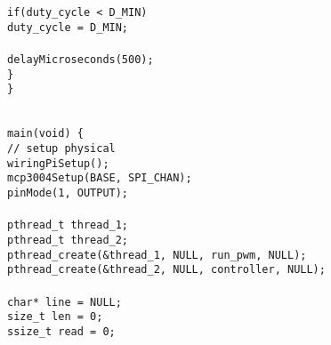 \documentclass[a4paper, 12pt]{article}
\begin{document}
\begin{appendices}
	\texttt{\hspace*{2em}if(duty\_cycle < D\_MIN)} \\\noindent
	\texttt{\hspace*{3em}duty\_cycle = D\_MIN;} \\\noindent
	\texttt{ \\\noindent}
	\texttt{\hspace*{2em}delayMicroseconds(500);} \\\noindent
	\texttt{\hspace*{1em}\}}\\\noindent
        \texttt{\}} \\\noindent
        \texttt{ \\\noindent}

	\texttt{main(void) \{ \\\noindent}
	\texttt{\hspace*{1em}// setup physical} \\\noindent
	\texttt{\hspace*{1em}wiringPiSetup();} \\\noindent
	\texttt{\hspace*{1em}mcp3004Setup(BASE, SPI\_CHAN);} \\\noindent
	\texttt{\hspace*{1em}pinMode(1, OUTPUT); } \\\noindent
	\texttt{\hspace*{1em}\\\noindent}
	\texttt{\hspace*{1em}pthread\_t thread\_1;} \\\noindent
	\texttt{\hspace*{1em}pthread\_t thread\_2;} \\\noindent
	\texttt{\hspace*{1em}pthread\_create(\&thread\_1, NULL, run\_pwm, NULL);} \\\noindent
	\texttt{\hspace*{1em}pthread\_create(\&thread\_2, NULL, controller, NULL);} \\\noindent
	\texttt{\hspace*{1em}\\\noindent}
	\texttt{\hspace*{1em}char* line = NULL;} \\\noindent
	\texttt{\hspace*{1em}size\_t len = 0;} \\\noindent
	\texttt{\hspace*{1em}ssize\_t read = 0;} \\\noindent

\end{appendices}
\end{document}
